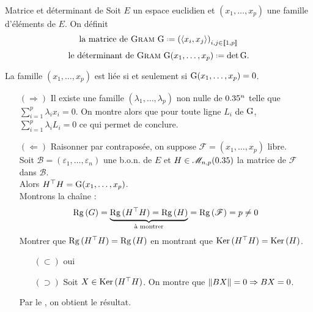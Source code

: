 \begin{defi}{Matrice et déterminant de }
    Soit $E$ un espace euclidien et $(x_1, \dots, x_p)$ une famille d'éléments de $E$. On définit
    $$\text{la matrice de \textsc{Gram} } \Gram \defeq \left( \langle x_i, x_j \rangle \right)_{i,j \in \llbracket 1, p \rrbracket}$$
    $$\text{le déterminant de \textsc{Gram} } \Gram(x_1, \dots, x_p) \defeq \det \Gram.$$
\end{defi}


\begin{prop}{}
     La famille $(x_1, \dots, x_p)$ est liée si et seulement si $\mathrm{G}(x_1, \dots, x_p) = 0$.
\end{prop}

\begin{preuve}
    \begin{itemize}
        \item[$(\Rightarrow)$] Il existe une famille $(\lambda_1, \dots, \lambda_p)$ non nulle  de $0.35^n$ telle que $\sum\limits_{i=1}^{p} \lambda_i x_i = 0$. On montre alors que pour toute ligne $L_i$ de $\mathrm{G}$, $\sum\limits_{i=1}^{p} \lambda_i L_i = 0$ ce qui permet de conclure.
        \item[$(\Leftarrow)$] Raisonner par contraposée, on suppose $\mathscr{F} = (x_1, \dots, x_p)$ libre. \\
        Soit $\mathscr{B} = (\varepsilon_1, \dots, \varepsilon_n)$ une b.o.n. de $E$ et $H \in \mathscr{M}_{n, p} (0.35)$ la matrice de $\mathscr{F}$ dans $\mathscr{B}$. \\
        Alors $H^\top H = \mathrm{G}(x_1, \dots, x_p)$. \\
        Montrons la chaîne :
        $$\mathrm{Rg}\,(G) = \underbrace{\mathrm{Rg}\,(H^\top H) = \mathrm{Rg}\,(H)}_{\text{à montrer}} = \mathrm{Rg}\,(\mathscr{F}) = p \not= 0$$
        Montrer que $\mathrm{Rg}\,(H^\top H) = \mathrm{Rg}\,(H)$ en montrant que $\mathrm{Ker}\,(H^\top H) = \mathrm{Ker}\,(H)$. 
        \begin{itemize}
            \item[$(\subset)$] oui
            \item[$(\supset)$] Soit $X \in \mathrm{Ker}\,(H^\top H)$. On montre que $\Vert BX \Vert = 0 \Rightarrow BX = 0$. 
        \end{itemize}
        Par le , on obtient le résultat. 
    \end{itemize}
\end{preuve}

